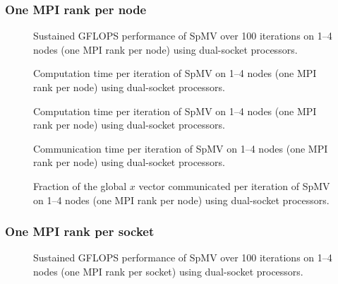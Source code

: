 \subsubsection{One MPI rank per node}
\begin{figure}[H]
    \centering
    \caption{Sustained GFLOPS performance of SpMV over 100 iterations on 1–4 nodes (one MPI rank per node) using dual-socket \fpgaq{} processors.}
    \label{fig:gflopsfpgaqmulti}
\end{figure}

\begin{figure}[H]
    \centering
    \caption{Computation time per iteration of SpMV on 1–4 nodes (one MPI rank per node) using dual-socket \fpgaq{} processors.}
    \label{fig:tfpgaqmulti}
\end{figure}

\begin{figure}[H]
    \centering
    \caption{Computation time per iteration of SpMV on 1–4 nodes (one MPI rank per node) using dual-socket \fpgaq{} processors.}
    \label{fig:tcompfpgaqmulti}
\end{figure}

\begin{figure}[H]
    \centering
    \caption{Communication time per iteration of SpMV on 1–4 nodes (one MPI rank per node) using dual-socket \fpgaq{} processors.}
    \label{fig:tcommfpgaqmulti}
\end{figure}


\begin{figure}[H]
    \centering
    \caption{Fraction of the global \(x\) vector communicated per iteration of SpMV on 1–4 nodes (one MPI rank per node) using dual-socket \fpgaq{} processors.}
    \label{fig:commloadfpgaqmulti}
\end{figure}

\subsubsection{One MPI rank per socket}

\begin{figure}[H]
    \centering
    \caption{Sustained GFLOPS performance of SpMV over 100 iterations on 1–4 nodes (one MPI rank per socket) using dual-socket \fpgaq{} processors.}
    \label{fig:gflopsfpgaqmpimulti}
\end{figure}

